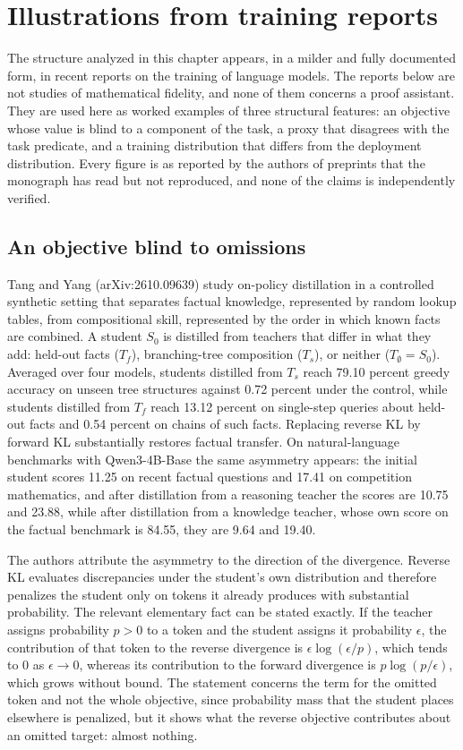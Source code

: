 \section{Illustrations from training reports}
\label{sec:trainillus}

The structure analyzed in this chapter appears, in a milder and fully documented form, in recent reports on the training of language models. The reports below are not studies of mathematical fidelity, and none of them concerns a proof assistant. They are used here as worked examples of three structural features: an objective whose value is blind to a component of the task, a proxy that disagrees with the task predicate, and a training distribution that differs from the deployment distribution. Every figure is as reported by the authors of preprints that the monograph has read but not reproduced, and none of the claims is independently verified.

\subsection*{An objective blind to omissions}

Tang and Yang \cite{Tang26} (arXiv:2610.09639) study on-policy distillation in a controlled synthetic setting that separates factual knowledge, represented by random lookup tables, from compositional skill, represented by the order in which known facts are combined. A student $S_0$ is distilled from teachers that differ in what they add: held-out facts ($T_f$), branching-tree composition ($T_s$), or neither ($T_\emptyset = S_0$). Averaged over four models, students distilled from $T_s$ reach 79.10 percent greedy accuracy on unseen tree structures against 0.72 percent under the control, while students distilled from $T_f$ reach 13.12 percent on single-step queries about held-out facts and 0.54 percent on chains of such facts. Replacing reverse KL by forward KL substantially restores factual transfer. On natural-language benchmarks with Qwen3-4B-Base the same asymmetry appears: the initial student scores 11.25 on recent factual questions and 17.41 on competition mathematics, and after distillation from a reasoning teacher the scores are 10.75 and 23.88, while after distillation from a knowledge teacher, whose own score on the factual benchmark is 84.55, they are 9.64 and 19.40.

The authors attribute the asymmetry to the direction of the divergence. Reverse KL evaluates discrepancies under the student's own distribution and therefore penalizes the student only on tokens it already produces with substantial probability. The relevant elementary fact can be stated exactly. If the teacher assigns probability $p > 0$ to a token and the student assigns it probability $\epsilon$, the contribution of that token to the reverse divergence is $\epsilon \log(\epsilon/p)$, which tends to $0$ as $\epsilon \to 0$, whereas its contribution to the forward divergence is $p \log(p/\epsilon)$, which grows without bound. The statement concerns the term for the omitted token and not the whole objective, since probability mass that the student places elsewhere is penalized, but it shows what the reverse objective contributes about an omitted target: almost nothing.

